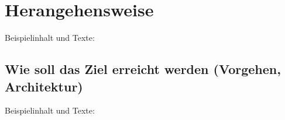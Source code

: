 
\section{Herangehensweise}
Beispielinhalt und Texte:

\subsection{Wie soll das Ziel erreicht werden (Vorgehen, Architektur)}
Beispielinhalt und Texte:
